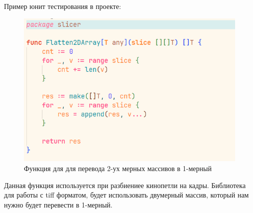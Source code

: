 Пример юнит тестирования в проекте:
\begin{figure}[H]%
	\begin{center}
		\includegraphics[width=.9\columnwidth]{./img/new/test_slice_1.png}%
	\end{center}
	\caption{Функция для для перевода 2-ух мерных массивов в 1-мерный}%
	\label{pic:test_slice_1}%
\end{figure}

Данная функция используется при разбиениее кинопетли на кадры. Библиотека для работы с tiff форматом, будет использовать
двумерный массив, который нам нужно будет перевести в 1-мерный.

